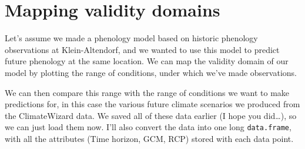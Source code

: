\documentclass[
]{book}
\begin{document}
\hypertarget{mapping-validity-domains}{%
\section{Mapping validity domains}\label{mapping-validity-domains}}

Let's assume we made a phenology model based on historic phenology observations at Klein-Altendorf, and we wanted to use this model to predict future phenology at the same location. We can map the validity domain of our model by plotting the range of conditions, under which we've made observations.

We can then compare this range with the range of conditions we want to make predictions for, in this case the various future climate scenarios we produced from the ClimateWizard data. We saved all of these data earlier (I hope you did\ldots), so we can just load them now. I'll also convert the data into one long \texttt{data.frame}, with all the attributes (Time horizon, GCM, RCP) stored with each data point.
\end{document}
